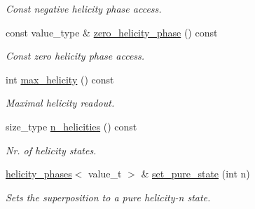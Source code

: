 \begin{DoxyCompactItemize}
\begin{DoxyCompactList}\small\item\em Const negative helicity phase access. \end{DoxyCompactList}\item 
\hypertarget{a00275_aebd313e8a517e88ed886d97fc795c97e}{}const value\+\_\+type \& \hyperlink{a00275_aebd313e8a517e88ed886d97fc795c97e}{zero\+\_\+helicity\+\_\+phase} () const \label{a00275_aebd313e8a517e88ed886d97fc795c97e}

\begin{DoxyCompactList}\small\item\em Const zero helicity phase access. \end{DoxyCompactList}\item 
\hypertarget{a00275_a973c81eba8f08e6646a80f41ae0da6c8}{}int \hyperlink{a00275_a973c81eba8f08e6646a80f41ae0da6c8}{max\+\_\+helicity} () const \label{a00275_a973c81eba8f08e6646a80f41ae0da6c8}

\begin{DoxyCompactList}\small\item\em Maximal helicity readout. \end{DoxyCompactList}\item 
\hypertarget{a00275_a8dbf49ceb87326a0428fd97b72b6a321}{}size\+\_\+type \hyperlink{a00275_a8dbf49ceb87326a0428fd97b72b6a321}{n\+\_\+helicities} () const \label{a00275_a8dbf49ceb87326a0428fd97b72b6a321}

\begin{DoxyCompactList}\small\item\em Nr. of helicity states. \end{DoxyCompactList}\item 
\hypertarget{a00275_a17058c9650fd8be8a7f8296d13a16a17}{}\hyperlink{a00275}{helicity\+\_\+phases}$<$ value\+\_\+t $>$ \& \hyperlink{a00275_a17058c9650fd8be8a7f8296d13a16a17}{set\+\_\+pure\+\_\+state} (int n)\label{a00275_a17058c9650fd8be8a7f8296d13a16a17}

\begin{DoxyCompactList}\small\item\em Sets the superposition to a pure helicity-\/n state. \end{DoxyCompactList}\end{DoxyCompactItemize}
